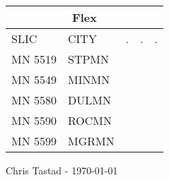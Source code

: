 \documentclass{article}
\begin{document}
\begin{tabular}[t]{l|ll|l|l}
\multicolumn{5}{c}{\textbf{Flex}} \\
\toprule
SLIC    & CITY  & .                   & .                   &    .             \\ \midrule
MN 5519 & STPMN & \cellcolor{blue}   & \cellcolor{red}    &                 \\
MN 5549 & MINMN & \cellcolor{blue}   & \cellcolor{yellow} & \cellcolor{red} \\
MN 5580 & DULMN & \cellcolor{yellow} & \cellcolor{red}    &                 \\
MN 5590 & ROCMN & \cellcolor{yellow} & \cellcolor{red}    &                 \\
MN 5599 & MGRMN & \cellcolor{yellow} & \cellcolor{red}    &                 \\ \bottomrule
\end{tabular}

\vspace{25ex}
Chris Tastad - \today
\end{document}
